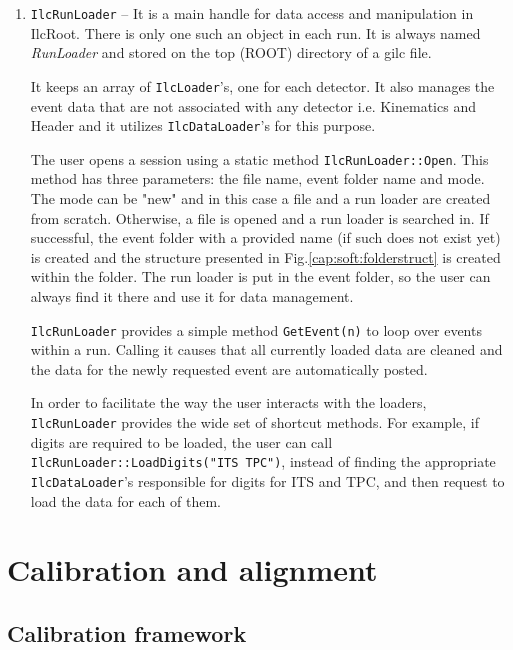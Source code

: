 \documentclass[12pt,a4paper,twoside]{article}
\begin{document}
{\begin{enumerate}
  
\item \texttt{IlcRunLoader} --  It is a main handle for data access and manipulation in
  IlcRoot. There is only one such an object in each run.
  It is always named {\it RunLoader} and stored
  on the top (ROOT) directory of a gilc file.
  
  It keeps an array of \texttt{IlcLoader}'s, one for each detector.
  It also manages the event data that are not associated with any detector
  i.e. Kinematics and Header and it utilizes \texttt{IlcDataLoader}'s
  for this purpose. 
  
  The user opens a session using a static method \texttt{IlcRunLoader::Open}.
  This method has three parameters: the file name, event folder name and mode.
  The mode can be "new" and in this case a file and a run loader are created from scratch. 
  Otherwise, a file is opened and a run loader is searched in.
  If successful, the event folder with a provided name 
  (if such does not exist yet) is created and the structure 
  presented in Fig.\ref{cap:soft:folderstruct} is created within the folder. 
  The run loader is 
  put in the event folder, so the user can always find it there
  and use it for data management.

  \texttt{IlcRunLoader} provides a simple method \texttt{GetEvent(n)} 
  to loop over events within a run. Calling it causes that all 
  currently loaded data are cleaned and the data for 
  the newly requested event are automatically posted.
  
  In order to facilitate the way the user interacts with the loaders,
  \texttt{IlcRunLoader} provides the wide set of shortcut methods. 
  For example, if digits are required to be loaded, the user can call
  \texttt{IlcRunLoader::LoadDigits("ITS TPC")}, instead of finding the appropriate
  \texttt{IlcDataLoader}'s responsible for digits for ITS and TPC, 
  and then request to load the data for each of them.
  

\end{enumerate}

\newpage
\section{Calibration and alignment}


\subsection{Calibration framework}


}
\end{document}

